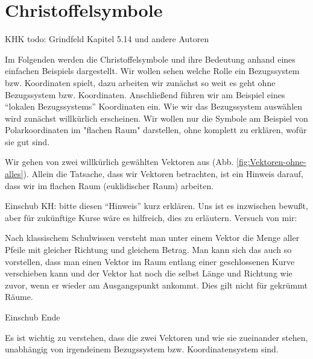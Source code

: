 \section{Christoffelsymbole}

KHK todo: Grindfeld Kapitel 5.14 und andere Autoren



Im Folgenden werden die Christoffelsymbole und ihre Bedeutung anhand eines einfachen Beispiels dargestellt. Wir wollen sehen welche Rolle ein Bezugssystem bzw.  Koordinaten spielt, dazu arbeiten wir zunächst so weit es geht ohne Bezugssystem bzw. Koordinaten. Anschließend führen wir am Beispiel eines "`lokalen Bezugssystems"' Koordinaten ein. Wie wir das Bezugssystem auswählen wird zunächst willkürlich erscheinen. Wir wollen nur die Symbole am Beispiel von Polarkoordinaten im "flachen Raum" darstellen, ohne komplett zu erklären, wofür sie gut sind.

Wir gehen von zwei willkürlich gewählten Vektoren aus (Abb. \ref{fig:Vektoren-ohne-alles}). Allein die Tatsache, dass wir Vektoren betrachten, ist ein Hinweis darauf, dass wir im flachen Raum (euklidischer Raum) arbeiten. 

\bigskip
Einschub KH: bitte diesen "`Hinweis"' kurz erklären. Uns ist es inzwischen bewußt, aber für zukünftige Kurse wäre es hilfreich, dies zu erläutern. Versuch von mir: 

Nach klassischem Schulwissen versteht man unter einem Vektor die Menge aller Pfeile mit gleicher Richtung und gleichem Betrag. Man kann sich das auch so vorstellen, dass man einen Vektor im Raum entlang einer geschlossenen Kurve verschieben kann und der Vektor hat noch die selbst Länge und Richtung wie zuvor, wenn er wieder am Ausgangspunkt ankommt. Dies gilt nicht für gekrümmt Räume. 

Einschub Ende
\bigskip

Es ist wichtig zu verstehen, dass die zwei Vektoren und wie sie zueinander stehen, unabhängig von irgendeinem Bezugssystem bzw. Koordinatensystem sind. 

